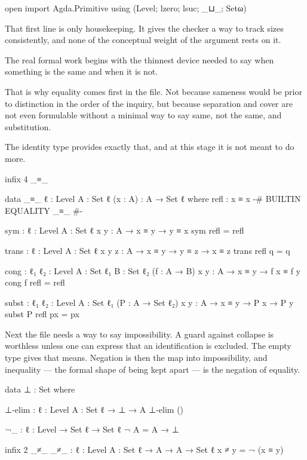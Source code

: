 \documentclass[11pt,a4paper]{book}
\begin{document}
\begin{code}
open import Agda.Primitive using (Level; lzero; lsuc; _⊔_; Setω)
\end{code}

That first line is only housekeeping. It gives the checker a way to track
sizes consistently, and none of the conceptual weight of the argument rests
on it.

The real formal work begins with the thinnest device needed to say when
something is the same and when it is not.

That is why equality comes first in the file. Not because sameness would be
prior to distinction in the order of the inquiry, but because separation
and cover are not even formulable without a minimal way to say same, not
the same, and substitution.

The identity type provides exactly that, and at this stage it is not meant
to do more.

\begin{code}
infix 4 _≡_

data _≡_ {ℓ : Level} {A : Set ℓ} (x : A) : A → Set ℓ where
  refl : x ≡ x
{-# BUILTIN EQUALITY _≡_ #-}

sym : {ℓ : Level} {A : Set ℓ} {x y : A} → x ≡ y → y ≡ x
sym refl = refl

trans : {ℓ : Level} {A : Set ℓ} {x y z : A} → x ≡ y → y ≡ z → x ≡ z
trans refl q = q

cong : {ℓ₁ ℓ₂ : Level} {A : Set ℓ₁} {B : Set ℓ₂} (f : A → B) {x y : A} → x ≡ y → f x ≡ f y
cong f refl = refl

subst : {ℓ₁ ℓ₂ : Level} {A : Set ℓ₁} (P : A → Set ℓ₂) {x y : A} → x ≡ y → P x → P y
subst P refl px = px
\end{code}

Next the file needs a way to say impossibility. A guard against collapse is
worthless unless one can express that an identification is excluded. The
empty type gives that means. Negation is then the map into impossibility,
and inequality --- the formal shape of being kept apart --- is the
negation of equality.

\begin{code}
data ⊥ : Set where

⊥-elim : {ℓ : Level} {A : Set ℓ} → ⊥ → A
⊥-elim ()

¬_ : {ℓ : Level} → Set ℓ → Set ℓ
¬ A = A → ⊥

infix 2 _≠_
_≠_ : {ℓ : Level} {A : Set ℓ} → A → A → Set ℓ
x ≠ y = ¬ (x ≡ y)
\end{code}
\end{document}
